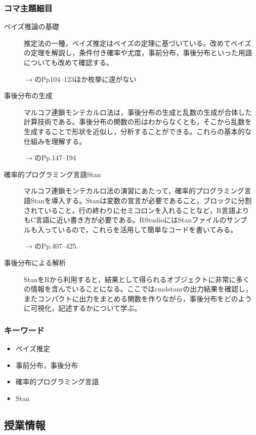 \subsubsection{コマ主題細目}
\begin{description}
	\item[ベイズ推論の基礎] 推定法の一種，ベイズ推定はベイズの定理に基づいている。改めてベイズの定理を解説し，条件付き確率や尤度，事前分布，事後分布といった用語についても改めて確認する。
	\begin{flushright}
		$\to$\textcite{Maeda2017}のPp104--123ほか枚挙に遑がない
	\end{flushright}
	\item[事後分布の生成] マルコフ連鎖モンテカルロ法は，事後分布の生成と乱数の生成が合体した計算技術である。事後分布の関数の形はわからなくとも，そこから乱数を生成することで形状を近似し，分析することができる。これらの基本的な仕組みを理解する。
	\begin{flushright}
		$\to$\textcite{Maeda2017}のPp.147--194
	\end{flushright}
	\item[確率的プログラミング言語Stan] マルコフ連鎖モンテカルロ法の演習にあたって，確率的プログラミング言語Stanを導入する。Stanは変数の宣言が必要であること，ブロックに分割されていること，行の終わりにセミコロンを入れることなど，R言語よりもC言語に近い書き方が必要である。RStudioにはStanファイルのサンプルも入っているので，これらを活用して簡単なコードを書いてみる。
	\begin{flushright}
		$\to$\textcite{Maeda2017}のPp.407--425.
	\end{flushright}
	\item[事後分布による解析] StanをRから利用すると，結果として得られるオブジェクトに非常に多くの情報を含んでいることになる。ここではcmdstanrの出力結果を確認し，またコンパクトに出力をまとめる関数を作りながら，事後分布をどのように可視化，記述するかについて学ぶ。
\end{description}
\subsubsection{キーワード}
\begin{itemize}
	\item ベイズ推定
	\item 事前分布，事後分布
	\item 確率的プログラミング言語
	\item Stan
\end{itemize}
\subsection{授業情報}
